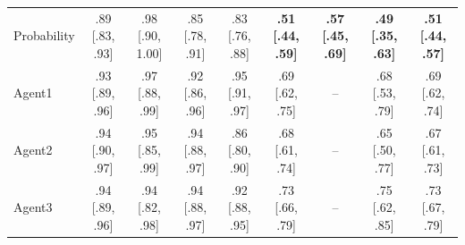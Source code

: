 \begin{table}[ht]
{\begin{tabular}{lcccccccc}
Probability & .89 [.83, .93] & .98 [.90, 1.00] & .85 [.78, .91] & .83 [.76, .88] & \textbf{.51 [.44, .59]} & \textbf{.57 [.45, .69]} & \textbf{.49 [.35, .63]} & \textbf{.51 [.44, .57]} \\
Agent1 & .93 [.89, .96] & .97 [.88, .99] & .92 [.86, .96] & .95 [.91, .97] & .69 [.62, .75] & -- & .68 [.53, .79] & .69 [.62, .74] \\
Agent2 & .94 [.90, .97] & .95 [.85, .99] & .94 [.88, .97] & .86 [.80, .90] & .68 [.61, .74] & -- & .65 [.50, .77] & .67 [.61, .73] \\
Agent3 & .94 [.89, .96] & .94 [.82, .98] & .94 [.88, .97] & .92 [.88, .95] & .73 [.66, .79] & -- & .75 [.62, .85] & .73 [.67, .79] \\
\hline
\end{tabular}%
}
\end{table}
